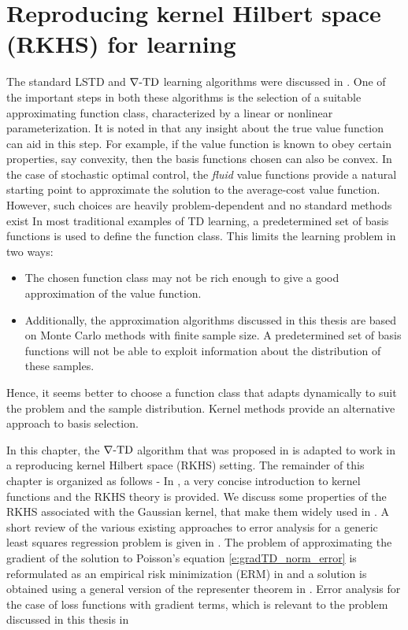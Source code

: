 \chapter{Reproducing kernel Hilbert space (RKHS) for learning}
\label{ch:rkhs}
The standard LSTD and $\nabla\text{-TD}$ learning algorithms were discussed in . One of the important steps in both these algorithms is the selection of a suitable approximating function class, characterized by  a linear or nonlinear parameterization. It is noted in \cite{ctcn} that any insight about the true value function can aid in this step. For example, if the value function is known to obey certain properties, say convexity, then the basis functions chosen can also be convex. In the case of stochastic optimal control, the \textit{fluid} value functions provide a natural starting point to approximate the solution to the average-cost value function. However, such choices are heavily problem-dependent and no standard methods exist In most traditional examples of TD learning, a predetermined set of basis functions is used to define the function class. This limits the learning problem in two ways:
\begin{itemize}
	\item The chosen function class may not be rich enough to give a good approximation of the value function.
	\item Additionally, the approximation algorithms discussed in this thesis are based on Monte Carlo methods with finite sample size. A predetermined set of basis functions will not be able to exploit information about the distribution of these samples.  
\end{itemize}
Hence, it seems better to choose a function class that adapts dynamically to suit the problem and the sample distribution. Kernel methods provide an alternative approach to basis selection. 

In this chapter, the $\nabla\text{-TD}$ algorithm that was proposed in  is adapted to work in a reproducing kernel Hilbert space (RKHS) setting.  The remainder of this chapter is organized as follows - In , a very concise introduction to kernel functions and the RKHS theory is provided. We discuss some properties of the RKHS associated with the Gaussian kernel, that make them  widely used in . A short review of the various existing approaches to error analysis for a generic least squares regression problem is given in . The problem of approximating the gradient of the solution to Poisson's equation \eqref{e:gradTD_norm_error} is reformulated as an empirical risk minimization (ERM) in  and a solution is obtained using a general version of the representer theorem in .  Error analysis for the case of loss functions with gradient terms, which is relevant to the problem discussed in this thesis in \Section{}
 
